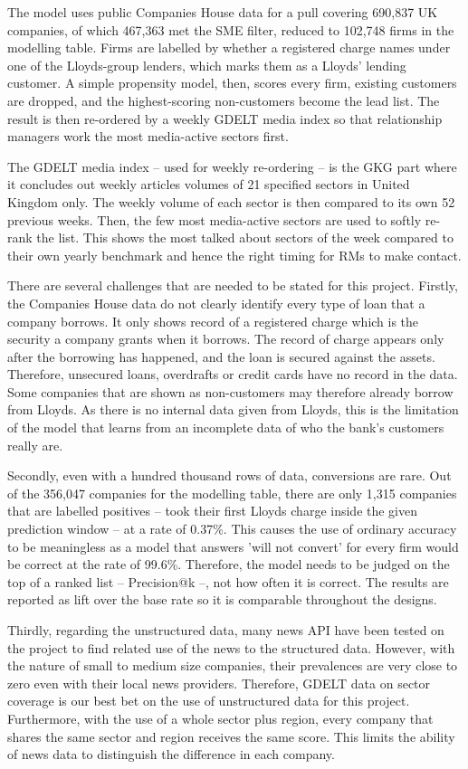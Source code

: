 \documentclass[ %
                    author={Natchalin Iwsakul \\ Inkaphol Siriwongwattana \\ Tanaphan Kummaraphat \\ Patorn Srisupap},
                supervisor={Fernando Moreno-Pino},
                    degree={MSc},
                     title={Propensity Modelling for SME Commercial Lending Using Open Public Data},
                  subtitle={Companies House filings and GDELT media coverage as predictors of first-time borrowing},
                      type={},
                      year={2026}]{dissertation}
\begin{document}
The model uses public Companies House data for a pull covering 690,837 UK companies, of which 467,363 met the SME filter, reduced to 102,748 firms in the modelling table. Firms are labelled by whether a registered charge names under one of the Lloyds-group lenders, which marks them as a Lloyds' lending customer. A simple propensity model, then, scores every firm, existing customers are dropped, and the highest-scoring non-customers become the lead list. The result is then re-ordered by a weekly GDELT media index so that relationship managers work the most media-active sectors first.

The GDELT media index -- used for weekly re-ordering -- is the GKG part where it concludes out weekly articles volumes of 21 specified sectors in United Kingdom only. The weekly volume of each sector is then compared to its own 52 previous weeks. Then, the few most media-active sectors are used to softly re-rank the list. This shows the most talked about sectors of the week compared to their own yearly benchmark and hence the right timing for RMs to make contact.

There are several challenges that are needed to be stated for this project. Firstly, the Companies House data do not clearly identify every type of loan that a company borrows. It only shows record of a registered charge which is the security a company grants when it borrows. The record of charge appears only after the borrowing has happened, and the loan is secured against the assets. Therefore, unsecured loans, overdrafts or credit cards have no record in the data. Some companies that are shown as non-customers may therefore already borrow from Lloyds. As there is no internal data given from Lloyds, this is the limitation of the model that learns from an incomplete data of who the bank's customers really are.

Secondly, even with a hundred thousand rows of data, conversions are rare. Out of the 356,047 companies for the modelling table, there are only 1,315 companies that are labelled positives -- took their first Lloyds charge inside the given prediction window -- at a rate of 0.37\%. This causes the use of ordinary accuracy to be meaningless as a model that answers 'will not convert' for every firm would be correct at the rate of 99.6\%. Therefore, the model needs to be judged on the top of a ranked list -- Precision@k --, not how often it is correct. The results are reported as lift over the base rate so it is comparable throughout the designs.

Thirdly, regarding the unstructured data, many news API have been tested on the project to find related use of the news to the structured data. However, with the nature of small to medium size companies, their prevalences are very close to zero even with their local news providers. Therefore, GDELT data on sector coverage is our best bet on the use of unstructured data for this project. Furthermore, with the use of a whole sector plus region, every company that shares the same sector and region receives the same score. This limits the ability of news data to distinguish the difference in each company.
\end{document}
